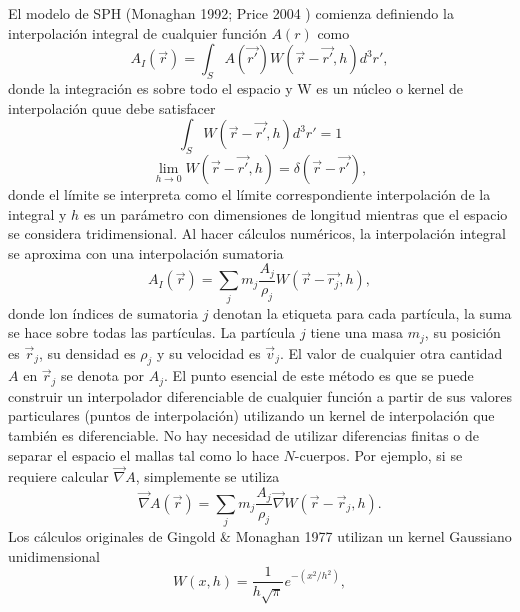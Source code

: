 \documentclass[a4paper,openright,12pt]{book}
\begin{document}
El modelo de SPH (Monaghan 1992; Price 2004 \cite{b8, b9}) comienza definiendo la interpolación integral de cualquier función $A(r)$ como
\begin{equation}
 A_{I}(\vec{r})
 =
 \int_{S} 
 A(\vec{r'})W(\vec{r}- \vec{r'}, h)d^{3}r',\label{eqn2.16}
\end{equation} 
donde la integración es sobre todo el espacio y W es un núcleo o kernel de interpolación quue debe satisfacer
\begin{equation}
 \int_{S}W(\vec{r}- \vec{r'},h)d^{3}r' = 1\label{eqn2.17}
\end{equation}
\begin{equation}
\lim_{h \to 0} W(\vec{r}-\vec{r'},h) = \delta(\vec{r}-\vec{r'}),\label{eqn2.18}
\end{equation}
donde el límite se interpreta como el límite correspondiente interpolación de la integral y $h$ es un parámetro con dimensiones de longitud mientras que el espacio se considera tridimensional. 
Al hacer cálculos numéricos, la interpolación integral se aproxima con una interpolación sumatoria
\begin{equation}
 A_{I}(\vec{r})
 =
 \sum_{j} m_{j} \frac{A_{j}}{\rho_{j}} W(\vec{r}- \vec{r_{j}},h),\label{eqn2.19}
\end{equation}
donde lon índices de sumatoria $j$ denotan la etiqueta para cada partícula, la suma se hace sobre todas las partículas. La partícula $j$ tiene una masa $m_{j}$, su posición es $\vec{r}_{j}$, su densidad es $\rho_{j}$ y su velocidad es $\vec{v}_{j}$. El valor de cualquier otra cantidad $A$ en $\vec{r}_{j}$ se denota por $A_{j}$. El punto esencial de este método es que se puede construir un interpolador diferenciable de cualquier función a partir de sus valores particulares (puntos de interpolación) utilizando un kernel de interpolación que también es diferenciable. No hay necesidad de utilizar diferencias finitas o de separar el espacio el mallas tal como lo hace $N$-cuerpos. Por ejemplo, si se requiere calcular $\vec{\nabla}A$, simplemente se utiliza
\begin{equation}
\vec{\nabla}A(\vec{r}) = 
\sum_{j} m_{j} \frac{A_{j}}{\rho_{j}} \vec{\nabla}W(\vec{r}-\vec{r}_{j}, h).\label{eqn 2.20}
\end{equation}
Los cálculos originales de Gingold \& Monaghan 1977 \cite{b9.1} utilizan un kernel Gaussiano unidimensional
\begin{equation}
  W(x,h)
  =
  \frac{1}{h \sqrt{\pi}} e^{-(x^{2}/h^{2})},\label{eqn2.21}
\end{equation}
\end{document}
